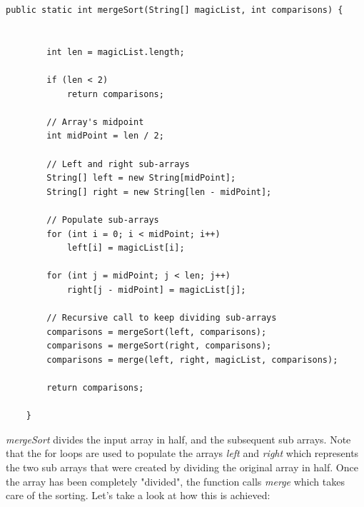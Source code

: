 \documentclass[letterpaper, 10pt]{article}
\begin{document}
\begin{lstlisting}
public static int mergeSort(String[] magicList, int comparisons) {

		
		int len = magicList.length;

		if (len < 2)
			return comparisons;
		
		// Array's midpoint
		int midPoint = len / 2;
		
		// Left and right sub-arrays
		String[] left = new String[midPoint];
		String[] right = new String[len - midPoint];
		
		// Populate sub-arrays
		for (int i = 0; i < midPoint; i++)
			left[i] = magicList[i];
		
		for (int j = midPoint; j < len; j++)
			right[j - midPoint] = magicList[j];
		
		// Recursive call to keep dividing sub-arrays
		comparisons = mergeSort(left, comparisons);
		comparisons = mergeSort(right, comparisons);
		comparisons = merge(left, right, magicList, comparisons);
		
		return comparisons;
		
	}
\end{lstlisting}
\textit{mergeSort} divides the input array in half, and the subsequent sub arrays. Note that the for loops are used to populate the arrays \textit{left} and \textit{right} which represents the two sub arrays that were created by dividing the original array in half. Once the array has been completely "divided", the function calls \textit{merge} which takes care of the sorting. Let's take a look at how this is achieved:
\end{document}
